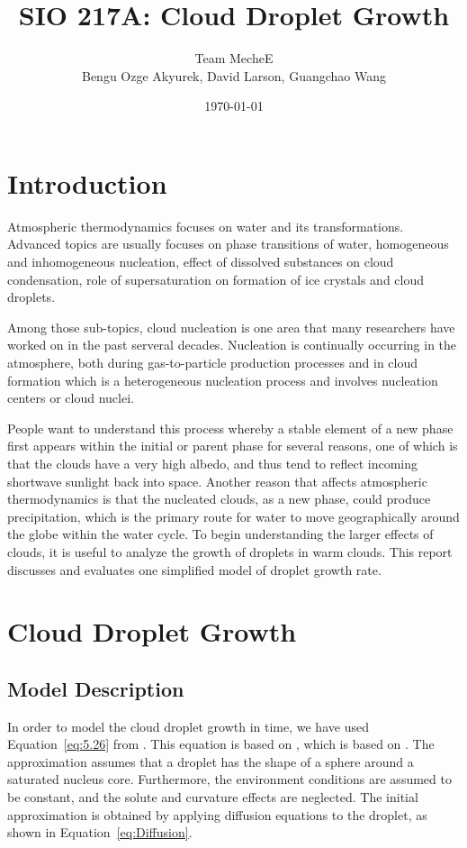 \documentclass[]{article}
\title{SIO 217A: Cloud Droplet Growth}
\author{Team MecheE \\ Bengu Ozge Akyurek, David Larson, Guangchao Wang}
\date{\today}
\begin{document}
\maketitle


\section{Introduction}
Atmospheric thermodynamics focuses on water and its transformations. Advanced
topics are usually focuses on phase transitions of water, homogeneous and
inhomogeneous nucleation, effect of dissolved substances on cloud condensation,
role of supersaturation on formation of ice crystals and cloud droplets.

Among those sub-topics, cloud nucleation is one area that
many researchers have worked on in the past serveral decades. Nucleation is
continually occurring in the atmosphere, both during gas-to-particle production
processes and in cloud formation which is a heterogeneous nucleation process
and involves nucleation centers or cloud nuclei.

People want to understand this process whereby a stable element of a new phase
first appears within the initial or parent phase for several reasons, one of
which is that the clouds have a very high albedo, and thus tend to reflect
incoming shortwave sunlight back into space. Another reason that affects
atmospheric thermodynamics is that the nucleated clouds, as a new phase, could
produce precipitation, which is the primary route for water to move
geographically around the globe within the water cycle. To begin understanding
the larger effects of clouds, it is useful to analyze the growth of droplets in
warm clouds. This report discusses and evaluates one simplified model of
droplet growth rate.


\section{Cloud Droplet Growth}

\subsection{Model Description}
In order to model the cloud droplet growth in time, we have used
Equation~\eqref{eq:5.26} from \cite{Curry}. This equation is based on
\cite{Mason}, which is based on \cite{Best}. The approximation assumes that a
droplet has the shape of a sphere around a saturated nucleus core. Furthermore,
the environment conditions are assumed to be constant, and the solute and
curvature effects are neglected. The initial approximation is obtained by
applying diffusion equations to the droplet, as shown in
Equation~\eqref{eq:Diffusion}.
\end{document}
